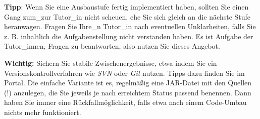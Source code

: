 \textbf{Tipp}: Wenn Sie eine Ausbaustufe fertig implementiert haben, sollten Sie
einen Gang zum\_zur Tutor\_in nicht scheuen, ehe Sie sich gleich an die n\"achste Stufe
heranwagen. Fragen Sie Ihre\_n Tutor\_in nach eventuellen Unklarheiten, falls Sie z. B.
inhaltlich die Aufgabenstellung nicht verstanden haben. Es ist Aufgabe der Tutor\_innen,
Fragen zu beantworten, also nutzen Sie dieses Angebot.

\textbf{Wichtig:} \glqq{}Sichern\grqq{} Sie stabile Zwischenergebnisse, etwa indem
Sie ein Versionskontrollverfahren wie \emph{SVN} oder \emph{Git} nutzen. Tipps dazu
finden Sie im Portal. Die einfache Variante ist es, regelm\"a\ss{}ig eine JAR-Datei
mit den Quellen (!) anzulegen, die Sie jeweils je nach erreichtem Status \glqq{}passend\grqq{}
benennen. Dann haben Sie immer eine R\"uckfallm\"oglichkeit, falls etwa nach einem Code-Umbau nichts mehr funktioniert.

